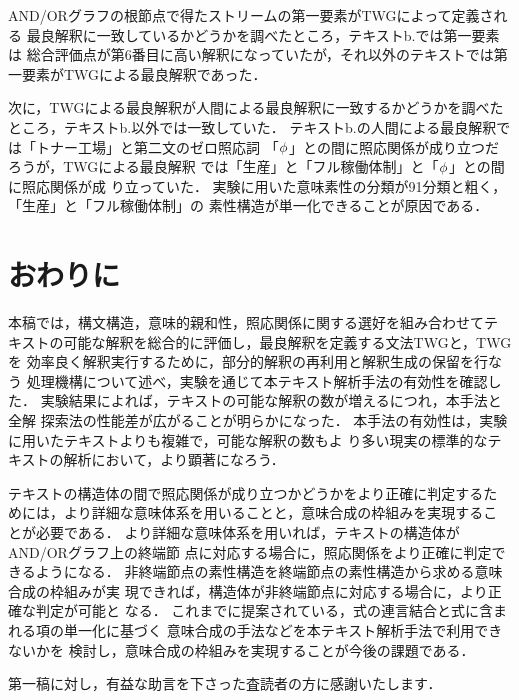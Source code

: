 AND/ORグラフの根節点で得たストリームの第一要素がTWGによって定義される
最良解釈に一致しているかどうかを調べたところ，テキストb.では第一要素は
総合評価点が第6番目に高い解釈になっていたが，それ以外のテキストでは第
一要素がTWGによる最良解釈であった．

次に，TWGによる最良解釈が人間による最良解釈に一致するかどうかを調べた
ところ，テキストb.以外では一致していた．
テキストb.の人間による最良解釈では「トナー工場」と第二文のゼロ照応詞
「$\phi_{}$」との間に照応関係が成り立つだろうが，TWGによる最良解釈
では「生産」と「フル稼働体制」と「$\phi_{}$」との間に照応関係が成
り立っていた．
実験に用いた意味素性の分類が91分類と粗く，「生産」と「フル稼働体制」の
素性構造が単一化できることが原因である．

\section{おわりに}
\label{sec:conclusion}

本稿では，構文構造，意味的親和性，照応関係に関する選好を組み合わせてテ
キストの可能な解釈を総合的に評価し，最良解釈を定義する文法TWGと，TWGを
効率良く解釈実行するために，部分的解釈の再利用と解釈生成の保留を行なう
処理機構について述べ，実験を通じて本テキスト解析手法の有効性を確認した．
実験結果によれば，テキストの可能な解釈の数が増えるにつれ，本手法と全解
探索法の性能差が広がることが明らかになった．
本手法の有効性は，実験に用いたテキストよりも複雑で，可能な解釈の数もよ
り多い現実の標準的なテキストの解析において，より顕著になろう．

テキストの構造体の間で照応関係が成り立つかどうかをより正確に判定するた
めには，より詳細な意味体系を用いることと，意味合成の枠組みを実現するこ
とが必要である．
より詳細な意味体系を用いれば，テキストの構造体がAND/ORグラフ上の終端節
点に対応する場合に，照応関係をより正確に判定できるようになる．
非終端節点の素性構造を終端節点の素性構造から求める意味合成の枠組みが実
現できれば，構造体が非終端節点に対応する場合に，より正確な判定が可能と
なる．
これまでに提案されている，式の連言結合と式に含まれる項の単一化に基づく
意味合成の手法\cite{Kato91}などを本テキスト解析手法で利用できないかを
検討し，意味合成の枠組みを実現することが今後の課題である．

\acknowledgment
第一稿に対し，有益な助言を下さった査読者の方に感謝いたします．




